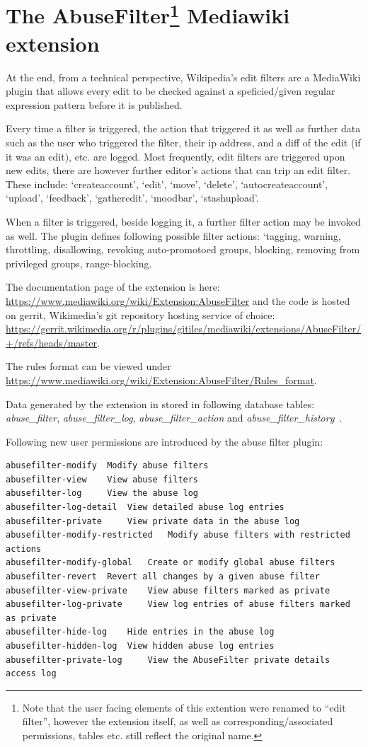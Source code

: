 
\section{The AbuseFilter\footnote{Note that the user facing elements of this extention were renamed to ``edit filter'', however the extension itself, as well as corresponding/associated permissions, tables etc. still reflect the original name.} Mediawiki extension}

At the end, from a technical perspective, Wikipedia's edit filters are a MediaWiki plugin that allows every edit to be checked against a speficied/given regular expression pattern before it is published.

Every time a filter is triggered, the action that triggered it as well as further data such as the user who triggered the filter, their ip address, and a diff of the edit (if it was an edit), etc. are logged.
Most frequently, edit filters are triggered upon new edits, there are however further editor's actions that can trip an edit filter.
These include: `createaccount', `edit', `move', `delete', `autocreateaccount', `upload', `feedback', `gatheredit', `moodbar', `stashupload'.

When a filter is triggered, beside logging it, a further filter action may be invoked as well.
The plugin defines following possible filter actions: `tagging, warning, throttling, disallowing, revoking auto-promotoed groups, blocking, removing from privileged groups, range-blocking.

The documentation page of the extension is here: \url{https://www.mediawiki.org/wiki/Extension:AbuseFilter}
and the code is hosted on gerrit, Wikimedia's git repository hosting service of choice: \url{https://gerrit.wikimedia.org/r/plugins/gitiles/mediawiki/extensions/AbuseFilter/+/refs/heads/master}.

The rules format can be viewed under \url{https://www.mediawiki.org/wiki/Extension:AbuseFilter/Rules_format}.

Data generated by the extension in stored in following database tables: \emph{abuse\_filter}, \emph{abuse\_filter\_log}, \emph{abuse\_filter\_action} and \emph{abuse\_filter\_history}~\cite{gerrit-abusefilter}.

Following new user permissions are introduced by the abuse filter plugin:
\begin{verbatim}
abusefilter-modify 	Modify abuse filters
abusefilter-view 	View abuse filters
abusefilter-log 	View the abuse log
abusefilter-log-detail 	View detailed abuse log entries
abusefilter-private 	View private data in the abuse log
abusefilter-modify-restricted 	Modify abuse filters with restricted actions
abusefilter-modify-global 	Create or modify global abuse filters
abusefilter-revert 	Revert all changes by a given abuse filter
abusefilter-view-private 	View abuse filters marked as private
abusefilter-log-private 	View log entries of abuse filters marked as private
abusefilter-hide-log 	Hide entries in the abuse log
abusefilter-hidden-log 	View hidden abuse log entries
abusefilter-private-log 	View the AbuseFilter private details access log
\end{verbatim}

